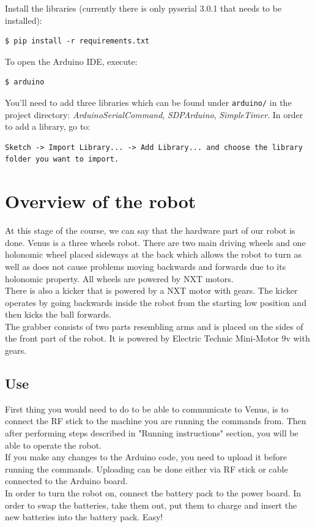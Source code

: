 \documentclass[12pt]{article}
\begin{document}
Install the libraries (currently there is only pyserial 3.0.1 that needs to be installed):
\begin{lstlisting}
$ pip install -r requirements.txt
\end{lstlisting}

To open the Arduino IDE, execute:
\begin{lstlisting}
$ arduino
\end{lstlisting}

You'll need to add three libraries which can be found under \texttt{arduino/} in the project directory: \textit{ArduinoSerialCommand}, \textit{SDPArduino}, \textit{SimpleTimer}. In order to add a library, go to:
\begin{lstlisting}
Sketch -> Import Library... -> Add Library... and choose the library folder you want to import.
\end{lstlisting}

\section{Overview of the robot}

At this stage of the course, we can say that the hardware part of our robot is done. Venus is a three wheels robot. There are two main driving wheels and one holonomic wheel placed sideways at the back which allows the robot to turn as well as does not cause problems moving backwards and forwards due to its holonomic property. All wheels are powered by NXT motors. 
\\There is also a kicker that is powered by a NXT motor with gears. The kicker operates by going backwards inside the robot from the starting low position and then kicks the ball forwards.
\\The grabber consists of two parts resembling arms and is placed on the sides of the front part of the robot. It is powered by Electric Technic Mini-Motor 9v with gears. 

\subsection{Use}

First thing you would need to do to be able to communicate to Venus, is to connect the RF stick to the machine you are running the commands from. Then after performing steps described in "Running instructions" section, you will be able to operate the robot.
\\If you make any changes to the Arduino code, you need to upload it before running the commands. Uploading can be done either via RF stick or cable connected to the Arduino board. 
\\In order to turn the robot on, connect the battery pack to the power board.
In order to swap the batteries, take them out, put them to charge and insert
the new batteries into the battery pack. Easy!
\end{document}
